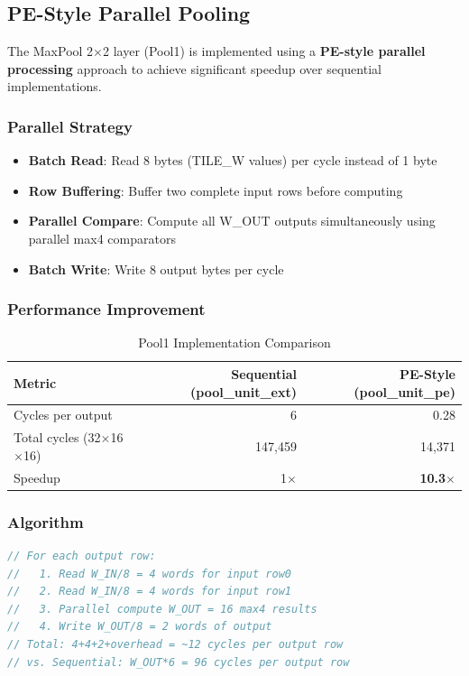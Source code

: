 \documentclass[11pt,a4paper]{article}
\begin{document}
\subsection{PE-Style Parallel Pooling}

The MaxPool 2$\times$2 layer (Pool1) is implemented using a \textbf{PE-style parallel processing} approach to achieve significant speedup over sequential implementations.

\subsubsection{Parallel Strategy}
\begin{itemize}
    \item \textbf{Batch Read}: Read 8 bytes (TILE\_W values) per cycle instead of 1 byte
    \item \textbf{Row Buffering}: Buffer two complete input rows before computing
    \item \textbf{Parallel Compare}: Compute all W\_OUT outputs simultaneously using parallel max4 comparators
    \item \textbf{Batch Write}: Write 8 output bytes per cycle
\end{itemize}

\subsubsection{Performance Improvement}
\begin{table}[H]
\centering
\caption{Pool1 Implementation Comparison}
\begin{tabular}{lrr}
\toprule
\textbf{Metric} & \textbf{Sequential (pool\_unit\_ext)} & \textbf{PE-Style (pool\_unit\_pe)} \\
\midrule
Cycles per output & 6 & 0.28 \\
Total cycles (32$\times$16$\times$16) & 147,459 & 14,371 \\
Speedup & 1$\times$ & \textbf{10.3$\times$} \\
\bottomrule
\end{tabular}
\end{table}

\subsubsection{Algorithm}
\begin{lstlisting}[language=Verilog, caption=PE-Style MaxPool Algorithm]
// For each output row:
//   1. Read W_IN/8 = 4 words for input row0
//   2. Read W_IN/8 = 4 words for input row1  
//   3. Parallel compute W_OUT = 16 max4 results
//   4. Write W_OUT/8 = 2 words of output
// Total: 4+4+2+overhead = ~12 cycles per output row
// vs. Sequential: W_OUT*6 = 96 cycles per output row
\end{lstlisting}
\end{document}

